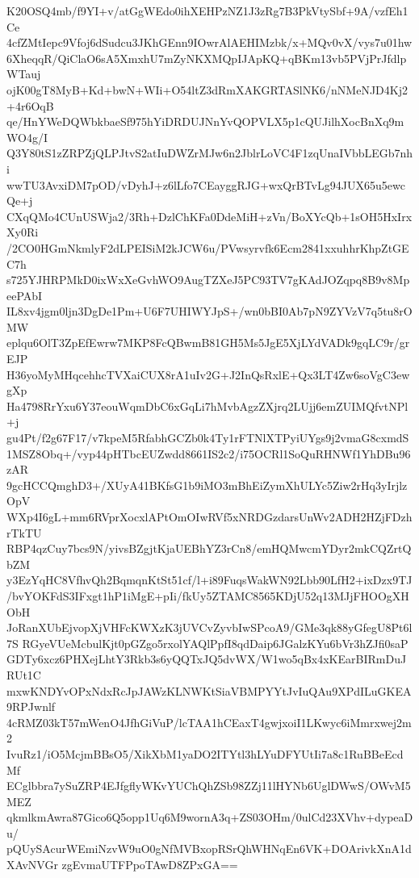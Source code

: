 K20OSQ4mb/f9YI+v/atGgWEdo0ihXEHPzNZ1J3zRg7B3PkVtySbf+9A/vzfEh1Ce
4cfZMtIepc9Vfoj6dSudcu3JKhGEnn9IOwrAlAEHIMzbk/x+MQv0vX/vys7u01hw
6XheqqR/QiClaO6sA5XmxhU7mZyNKXMQpIJApKQ+qBKm13vb5PVjPrJfdlpWTauj
ojK00gT8MyB+Kd+bwN+WIi+O54ltZ3dRmXAKGRTASlNK6/nNMeNJD4Kj2+4r6OqB
qe/HnYWeDQWbkbaeSf975hYiDRDUJNnYvQOPVLX5p1cQUJilhXocBnXq9mWO4g/I
Q3Y80tS1zZRPZjQLPJtvS2atIuDWZrMJw6n2JblrLoVC4F1zqUnaIVbbLEGb7nhi
wwTU3AvxiDM7pOD/vDyhJ+z6lLfo7CEayggRJG+wxQrBTvLg94JUX65u5ewcQe+j
CXqQMo4CUnUSWja2/3Rh+DzlChKFa0DdeMiH+zVn/BoXYcQb+1sOH5HxIrxXy0Ri
/2CO0HGmNkmlyF2dLPEISiM2kJCW6u/PVwsyrvfk6Ecm2841xxuhhrKhpZtGEC7h
s725YJHRPMkD0ixWxXeGvhWO9AugTZXeJ5PC93TV7gKAdJOZqpq8B9v8MpeePAbI
IL8xv4jgm0ljn3DgDe1Pm+U6F7UHIWYJpS+/wn0bBI0Ab7pN9ZYVzV7q5tu8rOMW
eplqu6OlT3ZpEfEwrw7MKP8FcQBwmB81GH5Ms5JgE5XjLYdVADk9gqLC9r/grEJP
H36yoMyMHqcehhcTVXaiCUX8rA1uIv2G+J2InQsRxlE+Qx3LT4Zw6soVgC3ewgXp
Ha4798RrYxu6Y37eouWqmDbC6xGqLi7hMvbAgzZXjrq2LUjj6emZUIMQfvtNPl+j
gu4Pt/f2g67F17/v7kpeM5RfabhGCZb0k4Ty1rFTNlXTPyiUYgs9j2vmaG8cxmdS
1MSZ8Obq+/vyp44pHTbcEUZwdd8661IS2c2/i75OCRl1SoQuRHNWf1YhDBu96zAR
9gcHCCQmghD3+/XUyA41BKfsG1b9iMO3mBhEiZymXhULYc5Ziw2rHq3yIrjlzOpV
WXp4I6gL+mm6RVprXocxlAPtOmOIwRVf5xNRDGzdarsUnWv2ADH2HZjFDzhrTkTU
RBP4qzCuy7bcs9N/yivsBZgjtKjaUEBhYZ3rCn8/emHQMwcmYDyr2mkCQZrtQbZM
y3EzYqHC8VfhvQh2BqmqnKtSt51cf/l+i89FuqsWakWN92Lbb90LfH2+ixDzx9TJ
/bvYOKFdS3IFxgt1hP1iMgE+pIi/fkUy5ZTAMC8565KDjU52q13MJjFHOOgXHObH
JoRanXUbEjvopXjVHFcKWXzK3jUVCvZyvbIwSPcoA9/GMe3qk88yGfegU8Pt6l7S
RGyeVUeMcbulKjt0pGZgo5rxolYAQlPpfI8qdDaip6JGalzKYu6bVr3hZJfi0saP
GDTy6xcz6PHXejLhtY3Rkb3s6yQQTxJQ5dvWX/W1wo5qBx4xKEarBIRmDuJRUt1C
mxwKNDYvOPxNdxRcJpJAWzKLNWKtSiaVBMPYYtJvIuQAu9XPdILuGKEA9RPJwnlf
4cRMZ03kT57mWenO4JfhGiVuP/lcTAA1hCEaxT4gwjxoiI1LKwyc6iMmrxwej2m2
IvuRz1/iO5McjmBBsO5/XikXbM1yaDO2ITYtl3hLYuDFYUtIi7a8c1RuBBeEcdMf
ECglbbra7ySuZRP4EJfgflyWKvYUChQhZSb98ZZj11lHYNb6UglDWwS/OWvM5MEZ
qkmlkmAwra87Gico6Q5opp1Uq6M9wornA3q+ZS03OHm/0ulCd23XVhv+dypeaDu/
pQUySAcurWEmiNzvW9uO0gNfMVBxopRSrQhWHNqEn6VK+DOArivkXnA1dXAvNVGr
zgEvmaUTFPpoTAwD8ZPxGA==
